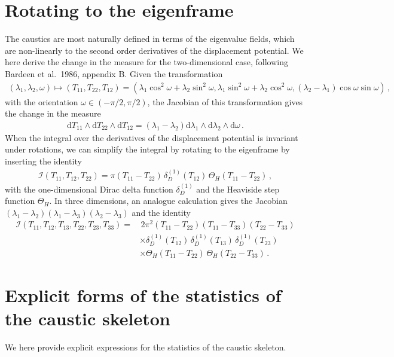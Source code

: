 \documentclass[a4paper, 11pt]{article}
\begin{document}
\section{Rotating to the eigenframe}\label{ap:measure}
The caustics are most naturally defined in terms of the eigenvalue fields, which are non-linearly to the second order derivatives of the displacement potential. We here derive the change in the measure for the two-dimensional case, following Bardeen et al.\ 1986, appendix B. Given the transformation
\begin{align}
(\lambda_1,\lambda_2,\omega)  \mapsto (T_{11},T_{22},T_{12}) = \left(\lambda_1 \cos^2 \omega + \lambda_2 \sin^2 \omega, \lambda_1 \sin^2\omega + \lambda_2 \cos^2 \omega, (\lambda_2 - \lambda_1)\cos \omega \sin \omega\right)\,,
\end{align}
with the orientation $\omega \in (-\pi/2,\pi/2)$, the Jacobian of this transformation gives the change in the measure
\begin{align}
\mathrm{d}T_{11}\wedge \mathrm{d}T_{22} \wedge \mathrm{d}T_{12} = (\lambda_1 - \lambda_2) \mathrm{d}\lambda_1 \wedge \mathrm{d}\lambda_2 \wedge \mathrm{d} \omega\,.
\end{align}
When the integral over the derivatives of the displacement potential is invariant under rotations, we can simplify the integral by rotating to the eigenframe by inserting the identity
\begin{align}
\mathcal{I}(T_{11},T_{12},T_{22}) = \pi(T_{11}-T_{22})\, \delta_D^{(1)}(T_{12})\, \Theta_H(T_{11}-T_{22})\,,
\end{align}
with the one-dimensional Dirac delta function $\delta_D^{(1)}$ and the Heaviside step function $\Theta_H$. In three dimensions, an analogue calculation gives the Jacobian $(\lambda_1-\lambda_2)(\lambda_1-\lambda_3)(\lambda_2-\lambda_3)$ and the identity
\begin{align}
\mathcal{I}(T_{11},T_{12},T_{13},T_{22},T_{23},T_{33})
=&\,2 \pi^2 (T_{11}-T_{22})(T_{11}-T_{33})(T_{22}-T_{33}) \nonumber\\
&\times \delta_D^{(1)}(T_{12})\, \delta_D^{(1)}(T_{13})\, \delta_D^{(1)}(T_{23}) \nonumber\\
&\times \Theta_H(T_{11}-T_{22})\, \Theta_H(T_{22}-T_{33})\,.
\end{align}

\section{Explicit forms of the statistics of the caustic skeleton}\label{ap:explicitFroms}
We here provide explicit expressions for the statistics of the caustic skeleton.
\end{document}
